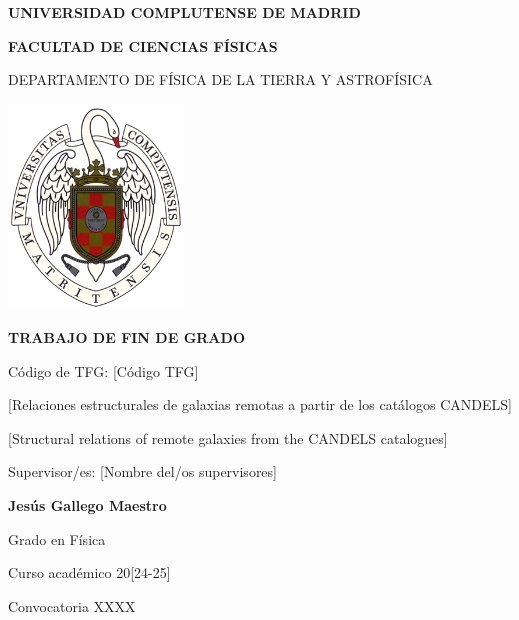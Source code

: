 \documentclass[11pt, a4paper]{article} %
\begin{document}
\begin{titlepage}
\centering
{ \bfseries \Large UNIVERSIDAD COMPLUTENSE DE MADRID}
\vspace{0.5cm}

{\bfseries  \Large FACULTAD DE CIENCIAS FÍSICAS} 
\vspace{1cm}

{\large DEPARTAMENTO DE FÍSICA DE LA TIERRA Y ASTROFÍSICA}
\vspace{0.8cm}

{\includegraphics[width=0.35\textwidth]{logo_UCM.png}} %
\vspace{0.8cm}

{\bfseries \Large TRABAJO DE FIN DE GRADO}
\vspace{2cm}

{\Large Código de TFG:  [C\'odigo TFG] } \vspace{5mm}

{\Large [Relaciones estructurales de galaxias remotas a partir de los catálogos CANDELS]}\vspace{5mm}

{\Large [Structural relations of remote galaxies from the CANDELS catalogues]}\vspace{5mm}

{\Large Supervisor/es: [Nombre del/os supervisores]}\vspace{20mm} 

{\bfseries \LARGE Jesús Gallego Maestro}\vspace{5mm} 

{\large Grado en Física}\vspace{5mm} 

{\large Curso acad\'emico 20[24-25]}\vspace{5mm} 

{\large Convocatoria XXXX}\vspace{5mm} 

\end{titlepage}
\newpage
\end{document}
